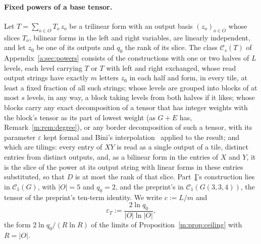 \documentclass[11pt]{article}
\theoremstyle{definition}
\theoremstyle{remark}
\begin{document}
\paragraph{Fixed powers of a base tensor.} Let $T=\sum_{o\in O}T_o\,z_o$ be a trilinear form with an output basis $(z_o)_{o\in O}$ whose slices $T_o$, bilinear forms in the left and right variables, are linearly independent, and let $z_0$ be one of its outputs and $q_0$ the rank of its slice. The class $\mathcal C_s(T)$ of Appendix~\ref{a:sec:powers} consists of the constructions with one or two halves of $L$ levels, each level carrying $T$ or $T$ with left and right exchanged, whose read output strings have exactly $m$ letters $z_0$ in each half and form, in every tile, at least a fixed fraction of all such strings; whose levels are grouped into blocks of at most $s$ levels, in any way, a block taking levels from both halves if it likes; whose blocks carry any exact decomposition of a tensor that has integer weights with the block's tensor as its part of lowest weight (as $G+E$ has, Remark~\ref{m:rem:degree}), or any border decomposition of such a tensor, with its parameter $\varepsilon$ kept formal and Bini's interpolation~\cite{Bin80} applied to the result; and which are tilings: every entry of $XY$ is read as a single output of a tile, distinct entries from distinct outputs, and, as a bilinear form in the entries of $X$ and $Y$, it is the slice of the power at its output string with linear forms in these entries substituted, so that $D$ is at most the rank of that slice. Part~\hyperref[m:partI]{I}'s construction lies in $\mathcal C_1(G)$, with $|O|=5$ and $q_0=2$, and the preprint's in $\mathcal C_1(G(3,3,4))$, the tensor of the preprint's ten-term identity. We write $c:=L/m$ and
\[
\varepsilon_T:=\frac{2\ln q_0}{|O|\ln|O|},
\]
the form $2\ln q_0/(R\ln R)$ of the limits of Proposition~\ref{m:prop:ceiling} with $R=|O|$.
\end{document}
